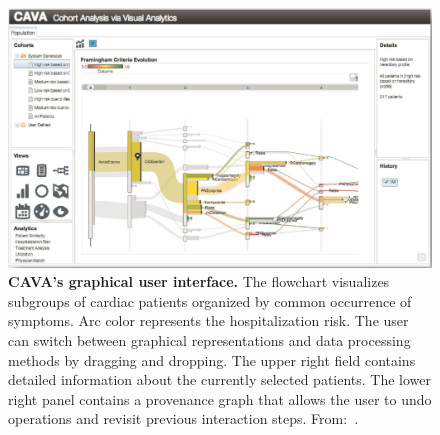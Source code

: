 \documentclass[
  oneside]{book}
\begin{document}
\begin{figure}[htbp]

{\centering \includegraphics[width=0.8\linewidth]{figures/03-cava} 

}

\caption{\textbf{CAVA's graphical user interface.} The flowchart visualizes subgroups of cardiac patients organized by common occurrence of symptoms. Arc color represents the hospitalization risk. The user can switch between graphical representations and data processing methods by dragging and dropping. The upper right field contains detailed information about the currently selected patients. The lower right panel contains a provenance graph that allows the user to undo operations and revisit previous interaction steps. From:~\autocite{Zhang:CAVA2015}.}\label{fig:03-cava}
\end{figure}
\end{document}

